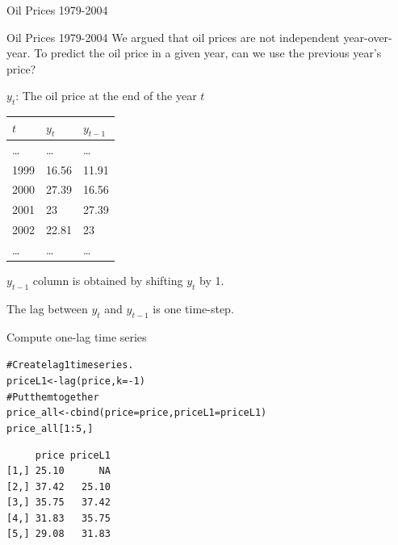 \documentclass{beamer}\usepackage[]{graphicx}\usepackage[]{color}
\makeatletter
\newcommand{\hlnum}[1]{\textcolor[rgb]{0.824,0.412,0.118}{#1}}%
\newcommand{\hlcom}[1]{\textcolor[rgb]{0.824,0.706,0.549}{#1}}%
\newcommand{\hlopt}[1]{\textcolor[rgb]{1,0.894,0.769}{#1}}%
\newcommand{\hlstd}[1]{\textcolor[rgb]{1,0.894,0.769}{#1}}%
\newcommand{\hlkwb}[1]{\textcolor[rgb]{0.804,0.776,0.451}{#1}}%
\newcommand{\hlkwc}[1]{\textcolor[rgb]{0.78,0.941,0.545}{#1}}%
\newcommand{\hlkwd}[1]{\textcolor[rgb]{1,0.78,0.769}{#1}}%
\newenvironment{kframe}{%
 \def\at@end@of@kframe{}%
 \ifinner\ifhmode%
  \def\at@end@of@kframe{\end{minipage}}%
  \begin{minipage}{\columnwidth}%
 \fi\fi%
 \def\FrameCommand##1{\hskip\@totalleftmargin \hskip-\fboxsep
 \colorbox{shadecolor}{##1}\hskip-\fboxsep
     \hskip-\linewidth \hskip-\@totalleftmargin \hskip\columnwidth}%
 \MakeFramed {\advance\hsize-\width
   \@totalleftmargin\z@ \linewidth\hsize
   \@setminipage}}%
 {\par\unskip\endMakeFramed%
 \at@end@of@kframe}
\newenvironment{knitrout}{}{} %
\makeatother
\begin{document}
\begin{darkframes}
\begin{frame}[fragile]{Oil Prices 1979-2004}
\begin{knitrout}
\end{knitrout}
\end{frame}
  
    
    
\begin{frame}[fragile]{Oil Prices 1979-2004}
      We argued that oil prices are not independent year-over-year. \pause To predict the oil price in a given year, can we use the previous year's price? \pause
      
      \begin{center}
        $y_t$: The oil price at the end of the year $t$ \pause\bigskip

        \begin{tabular}{lll}
          \hline
            $t$ & $y_t$ &  $y_{t-1}$\\
          \hline
          \ldots & \ldots & \ldots \\
          1999	& 16.56 & 11.91 \\
          2000 &	27.39 & 16.56  \\
          2001	& 23 & 27.39 \\
          2002	& 22.81 & 23 \\
          \ldots & \ldots & \ldots \\
          \hline 
        \end{tabular}
      \end{center}
      \pause
      
      $y_{t-1}$ column is obtained by shifting $y_t$ by 1. \pause
      
      The \alert{lag} between $y_t$ and $y_{t-1}$ is one time-step.
    
\end{frame}
    
    
\begin{frame}[fragile]{Compute one-lag time series}
      \fontsize{10}{10}\selectfont
\begin{knitrout}
\begin{kframe}
\begin{alltt}
\hlcom{# Create lag 1 time series.}
\hlstd{priceL1} \hlkwb{<-} \hlkwd{lag}\hlstd{(price,} \hlkwc{k}\hlstd{=}\hlopt{-}\hlnum{1}\hlstd{)}
\hlcom{# Put them together}
\hlstd{price_all} \hlkwb{<-} \hlkwd{cbind}\hlstd{(}\hlkwc{price}\hlstd{=price,} \hlkwc{priceL1}\hlstd{=priceL1)}
\hlstd{price_all[}\hlnum{1}\hlopt{:}\hlnum{5}\hlstd{,]}
\end{alltt}
\begin{verbatim}
     price priceL1
[1,] 25.10      NA
[2,] 37.42   25.10
[3,] 35.75   37.42
[4,] 31.83   35.75
[5,] 29.08   31.83
\end{verbatim}
\end{kframe}
\end{knitrout}
      \pause
      

\end{frame}
\end{darkframes}
\end{document}
